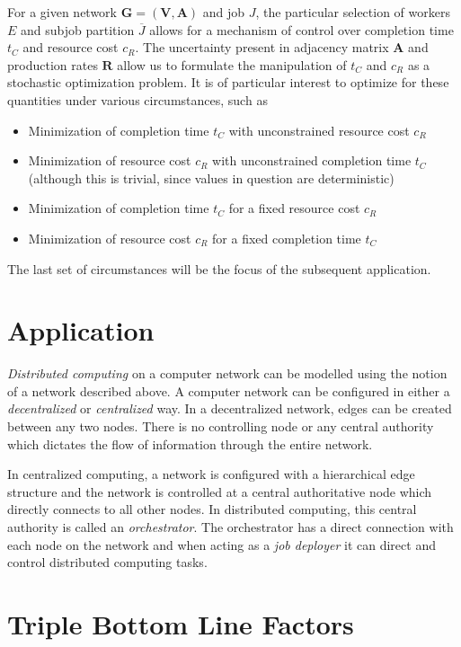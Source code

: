 \documentclass[../mthe-493-project-proposal.tex]{subfiles}
\begin{document}
    For a given network $\mathbf{G} = (\mathbf{V}, \mathbf{A})$ and job $J$, the particular selection of workers $E$ and subjob partition $\overline{J}$ allows for a mechanism of control over completion time $t_C$ and resource cost $c_R$. The uncertainty present in adjacency matrix $\mathbf{A}$ and production rates $\mathbf{R}$ allow us to formulate the manipulation of $t_C$ and $c_R$ as a stochastic optimization problem. It is of particular interest to optimize for these quantities under various circumstances, such as

    \begin{itemize}
        \item Minimization of completion time $t_C$ with unconstrained resource cost $c_R$
        \item Minimization of resource cost $c_R$ with unconstrained completion time $t_C$ (although this is trivial, since values in question are deterministic)
        \item Minimization of completion time $t_C$ for a fixed resource cost $c_R$
        \item Minimization of resource cost $c_R$ for a fixed completion time $t_C$
    \end{itemize}

    The last set of circumstances will be the focus of the subsequent application.

    \section{Application}

    \textit{Distributed computing} on a computer network can be modelled using the notion of a network described above. A computer network can be configured in either a \textit{decentralized} or \textit{centralized} way. In a decentralized network, edges can be created between any two nodes. There is no controlling node or any central authority which dictates the flow of information through the entire network.

    In centralized computing, a network is configured with a hierarchical edge structure and the network is controlled at a central authoritative node which directly connects to all other nodes. In distributed computing, this central authority is called an \textit{orchestrator}. The orchestrator has a direct connection with each node on the network and when acting as a \textit{job deployer} it can direct and control distributed computing tasks.

    \section{Triple Bottom Line Factors}
    \blindtext
\end{document}
